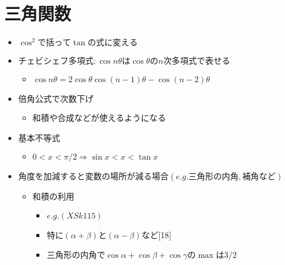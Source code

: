 \documentclass[dvipdfmx,uplatex]{jsarticle}
\begin{document}
\section{三角関数}
\begin{itemize}
	\item $ \cos^{2} で括って \tan の式に変える$
	\item $ チェビシェフ多項式: \cos nθ は \cos θ の n 次多項式で表せる$
	\begin{itemize}
		\item $\cos n\theta = 2\cos \theta \cos (n-1)\theta - \cos (n-2)\theta$
	\end{itemize}
	\item $ 倍角公式で次数下げ$
	\begin{itemize}
		\item 和積や合成などが使えるようになる
	\end{itemize}
	\item $ 基本不等式$
	\begin{itemize}
		\item $ 0 < x < π/2 ⇒ \sin x < x < \tan x$
	\end{itemize}
	\item $ 角度を加減すると変数の場所が減る場合(e.g.三角形の内角,補角など)$
	\begin{itemize}
		\item $ 和積の利用$
		\begin{itemize}
			\item $ e.g. (XSk115)$
			\item 特に$( \alpha + \beta )と( \alpha - \beta )$など[18]
			\item $三角形の内角で \cos \alpha + \cos \beta + \cos \gamma の \max は3/2$
		\end{itemize}
	\end{itemize}
\end{itemize}
\end{document}
